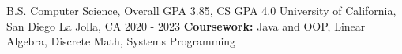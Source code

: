 
\begin{cventries}
  \cventry
    {B.S. Computer Science, Overall GPA 3.85, CS GPA 4.0}
    {University of California, San Diego}
    {La Jolla, CA}
    {2020 - 2023}
    {
      \textbf{Coursework: } Java and OOP, Linear Algebra, Discrete Math, Systems Programming
    }
\end{cventries}
